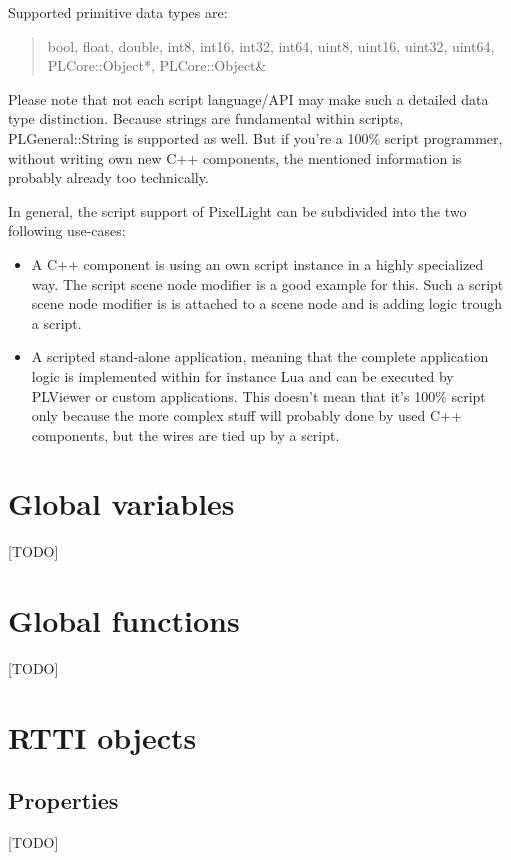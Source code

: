 Supported primitive data types are: \begin{quote}bool, float, double, int8, int16, int32, int64, uint8, uint16, uint32, uint64, PLCore::Object*, PLCore::Object\&\end{quote}

Please note that not each script language/API may make such a detailed data type distinction. Because strings are fundamental within scripts, PLGeneral::String is supported as well. But if you're a 100\% script programmer, without writing own new C++ components, the mentioned information is probably already too technically.

In general, the script support of PixelLight can be subdivided into the two following use-cases:
\begin{itemize}
\item{A C++ component is using an own script instance in a highly specialized way. The script scene node modifier is a good example for this. Such a script scene node modifier is is attached to a scene node and is adding logic trough a script.}
\item{A scripted stand-alone application, meaning that the complete application logic is implemented within for instance Lua and can be executed by PLViewer or custom applications. This doesn't mean that it's 100\% script only because the more complex stuff will probably done by used C++ components, but the wires are tied up by a script.}
\end{itemize}




\section{Global variables}
[TODO]




\section{Global functions}
[TODO]




\section{RTTI objects}


\subsection{Properties}
[TODO]


